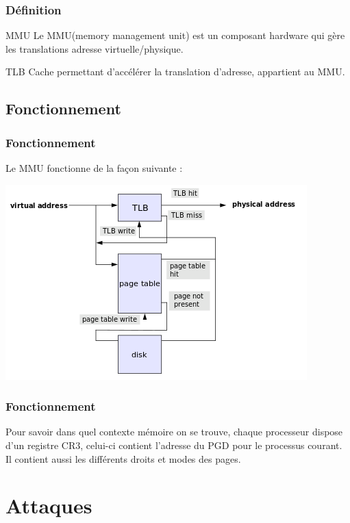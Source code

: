\documentclass{beamer}
\begin{document}
\begin{frame}
\frametitle{Définition}
\begin{block}{MMU}
Le MMU(memory management unit) est un composant hardware qui gère les translations adresse virtuelle/physique.
\end{block}
\begin{block}{TLB}
Cache permettant d’accélérer la translation d'adresse, appartient au MMU.
\end{block}
\end{frame}
\subsection{Fonctionnement}
\begin{frame}
\frametitle{Fonctionnement}
Le MMU fonctionne de la façon suivante :
\begin{center}
\includegraphics[scale=0.9]{./TLB.png}
\end{center}
\end{frame}
\begin{frame}
\frametitle{Fonctionnement}
Pour savoir dans quel contexte mémoire on se trouve, chaque processeur dispose d'un registre CR3, celui-ci contient l'adresse du PGD pour le processus courant. Il contient aussi les différents droits et modes des pages. 
\end{frame}
\section{Attaques}
\end{document}
